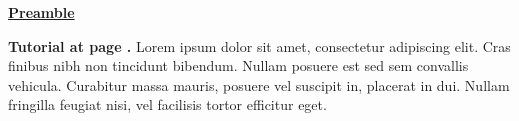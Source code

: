 {\centering \underline{\textbf{Preamble}} \par}

\textbf{Tutorial at page \pageref{March}.}
Lorem ipsum dolor sit amet, consectetur adipiscing elit.
Cras finibus nibh non tincidunt bibendum.
Nullam posuere est sed sem convallis vehicula.
Curabitur massa mauris, posuere vel suscipit in, placerat in dui.
Nullam fringilla feugiat nisi, vel facilisis tortor efficitur eget.

\noindent
\hspace*{0.76\linewidth} \theauthor \\
\hspace*{0.76\linewidth} 